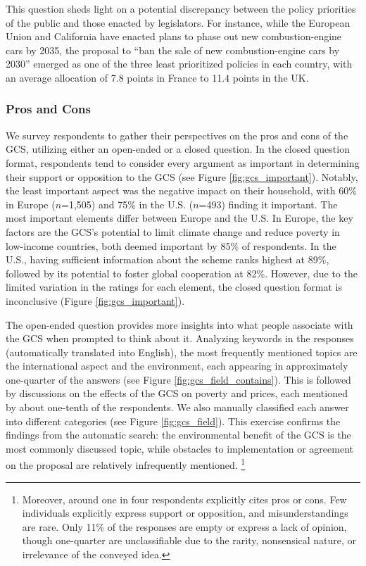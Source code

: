 This question sheds light on a potential discrepancy between the policy priorities of the public and those enacted by legislators. For instance, while the European Union and California have enacted plans to phase out new combustion-engine cars by 2035, the proposal to ``ban the sale of new combustion-engine cars by 2030'' emerged as one of the three least prioritized policies in each country, with an average allocation of 7.8 points in France to 11.4 points in the UK.

  
\subsubsection{Pros and Cons}\label{subsubsec:pros_cons}

We survey respondents to gather their perspectives on the pros and cons of the GCS, utilizing either an open-ended or a closed question. In the closed question format, respondents tend to consider every argument as important in determining their support or opposition to the GCS (see Figure \ref{fig:gcs_important}). Notably, the least important aspect was the negative impact on their household, with 60\% in Europe ($n$=1,505) and 75\% in the U.S. ($n$=493) finding it important. The most important elements differ between Europe and the U.S. In Europe, the key factors are the GCS's potential to limit climate change and reduce poverty in low-income countries, both deemed important by 85\% of respondents. In the U.S., having sufficient information about the scheme ranks highest at 89\%, followed by its potential to foster global cooperation at 82\%. However, due to the limited variation in the ratings for each element, the closed question format is inconclusive (Figure \ref{fig:gcs_important}). %

The open-ended question provides more insights into what people associate with the GCS when prompted to think about it. %
Analyzing keywords in the responses (automatically translated into English), the most frequently mentioned topics are the international aspect and the environment, each appearing in approximately one-quarter of the answers (see Figure \ref{fig:gcs_field_contains}). This is followed by discussions on the effects of the GCS on poverty and prices, each mentioned by about one-tenth of the respondents. We also manually classified each answer into different categories (see Figure \ref{fig:gcs_field}). This exercise confirms the findings from the automatic search: the environmental benefit of the GCS is the most commonly discussed topic, while obstacles to implementation or agreement on the proposal are relatively infrequently mentioned.%
\footnote{Moreover, around one in four respondents explicitly cites pros or cons. Few individuals explicitly express support or opposition, and misunderstandings are rare. Only 11\% of the responses are empty or express a lack of opinion, though one-quarter are unclassifiable due to the rarity, nonsensical nature, or irrelevance of the conveyed idea.}%

